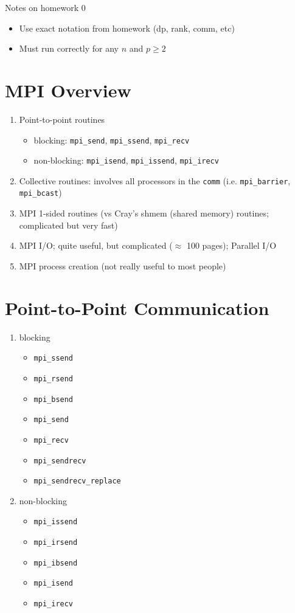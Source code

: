\documentclass[10pt]{article}
\newenvironment{mitemize}
{
  \begin{itemize}
  \setlength{\itemsep}{1pt}
  \setlength{\parskip}{0pt}
  \setlength{\parsep}{0pt}}{\end{itemize}
}
\newenvironment{menumerate}
{
  \begin{enumerate}
  \setlength{\itemsep}{1pt}
  \setlength{\parskip}{0pt}
  \setlength{\parsep}{0pt}}{\end{enumerate}
}
\begin{document}
Notes on homework 0
\begin{mitemize}
  \item Use exact notation from homework (dp, rank, comm, etc)
  \item Must run correctly for any $n$ and $p \geq 2$ 
\end{mitemize}

\section{MPI Overview}
\begin{menumerate}
  \item Point-to-point routines
  \begin{mitemize}
    \item blocking: \texttt{mpi\_send}, \texttt{mpi\_ssend}, \texttt{mpi\_recv}
    \item non-blocking: \texttt{mpi\_isend}, \texttt{mpi\_issend}, \texttt{mpi\_irecv}
  \end{mitemize}
  \item Collective routines: involves all processors in the \texttt{comm} (i.e. \texttt{mpi\_barrier}, \texttt{mpi\_bcast})
  \item MPI 1-sided routines (vs Cray's shmem (shared memory) routines; complicated but very fast)
  \item MPI I/O; quite useful, but complicated ($\approx$ 100 pages); Parallel I/O
  \item MPI process creation (not really useful to most people)
\end{menumerate}

\section{Point-to-Point Communication}
\begin{menumerate}
  \item blocking
  \begin{mitemize}
    \item \texttt{mpi\_ssend}
    \item \texttt{mpi\_rsend}
    \item \texttt{mpi\_bsend}
    \item \texttt{mpi\_send}
    \item \texttt{mpi\_recv}
    \item \texttt{mpi\_sendrecv}
    \item \texttt{mpi\_sendrecv\_replace}
  \end{mitemize}
  \item non-blocking
  \begin{mitemize}
    \item \texttt{mpi\_issend}
    \item \texttt{mpi\_irsend}
    \item \texttt{mpi\_ibsend}
    \item \texttt{mpi\_isend}
    \item \texttt{mpi\_irecv}
  \end{mitemize}
\end{menumerate}
\end{document}
